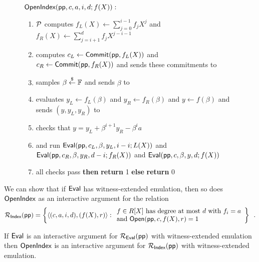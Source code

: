 \begin{figure}[!htp]
\noindent\begin{mdframed}[userdefinedwidth=\textwidth]
\begin{minipage}{\textwidth}
	\begin{flushleft}
	$\textsf{{OpenIndex}}(\textsf{pp}, c, a, i, d; f(X)):$ 
		\begin{enumerate}[nolistsep]
		    \item $\mathcal{P}$ computes $f_L(X) \gets \sum_{j=0}^{i-1} f_jX^j$ and $f_R(X) \gets \sum_{j=i+1}^d f_j X^{j-i-1}$
		    \item \prover computes $c_L \gets \textsf{{Commit}}(\textsf{pp}, f_L(X))$ and $c_R \gets \textsf{{Commit}}(\textsf{pp}, f_R(X))$ and sends these commitments to \verifier
		    \item \verifier samples $\beta \overset{\$}{\gets} \mathbb{F}$ and sends $\beta$ to \prover
		    \item \prover evaluates $y_L \gets f_L(\beta)$ and $y_R \gets f_R(\beta)$ and $y \gets f(\beta)$ and sends $(y, y_L, y_R)$ to \verifier
		    \item \verifier checks that $y = y_L + \beta^{i+1} y_R - \beta^i a$
		    \item \prover and \verifier run $\textsf{{Eval}}(\textsf{pp}, c_L, \beta, y_L, i-i; L(X))$ and $\textsf{{Eval}}(\textsf{pp}, c_R, \beta, y_R, d-i; f_R(X))$ and $\textsf{{Eval}}(\textsf{pp}, c, \beta, y, d; f(X))$
		    \item \pcif{}all checks pass \textbf{then} \textbf{return} 1 \textbf{else} \textbf{return} 0
		\end{enumerate}
	\end{flushleft}
\end{minipage}
\end{mdframed}
\end{figure}

We can show that if $\textsf{{Eval}}$ has witness-extended emulation, then so does $\textsf{{OpenIndex}}$ as an interactive argument for the relation
\[ 
\mathcal{R_\textsf{Index}}(\textsf{pp}) = \left\{
\langle (c, a, i, d), (f(X), r) \rangle
: 
\begin{array}{l} 
f \in R[X] \ \text{has degree at most} \ d \ \text{with} \ f_i = a \\ 
 \text{and} \ \textsf{{Open}}(\textsf{pp}, c, f(X), r) = 1 \\
\end{array}
\right\} \enspace .
\] 

\begin{lemma} 
If $\textsf{{Eval}}$ is an interactive argument for $\mathcal{R_\textsf{Eval}}(\textsf{pp})$ with witness-extended emulation then $\textsf{{OpenIndex}}$ is an interactive argument for $\mathcal{R_\textsf{Index}}(\textsf{pp})$ with witness-extended emulation. 
\end{lemma}

